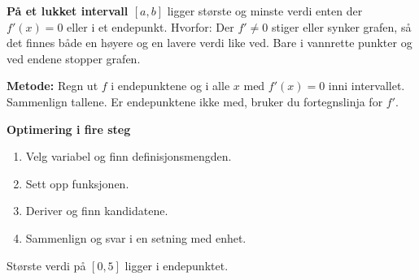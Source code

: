 \begin{mustkunne}
\begin{minipage}[t]{0.57\linewidth}
\textbf{På et lukket intervall $[a, b]$} ligger største og minste verdi enten der $f'(x) = 0$ eller i et endepunkt. Hvorfor: Der $f' \ne 0$ stiger eller synker grafen, så det finnes både en høyere og en lavere verdi like ved. Bare i vannrette punkter og ved endene stopper grafen.\par\smallskip
\textbf{Metode:} Regn ut $f$ i endepunktene og i alle $x$ med $f'(x) = 0$ inni intervallet. Sammenlign tallene. Er endepunktene ikke med, bruker du fortegnslinja for $f'$.\par\smallskip
\textbf{Optimering i fire steg}
\begin{enumerate}[leftmargin=1.4em,itemsep=0pt,topsep=2pt]
  \item Velg variabel og finn definisjonsmengden.
  \item Sett opp funksjonen.
  \item Deriver og finn kandidatene.
  \item Sammenlign og svar i en setning med enhet.
\end{enumerate}
\end{minipage}\hfill
\begin{minipage}[t]{0.40\linewidth}
\vspace{0pt}\centering
{}\par
{\footnotesize Største verdi på $[0, 5]$ ligger i endepunktet.}
\end{minipage}
\end{mustkunne}

